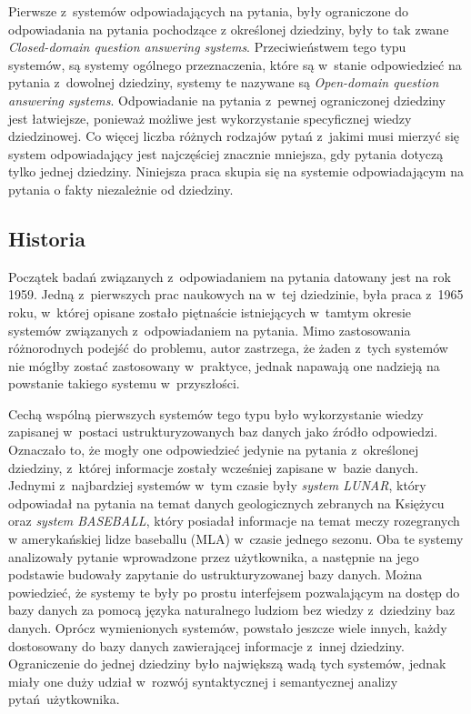 \documentclass[a4paper, twoside, openright, 12pt]{report}
\begin{document}
            Pierwsze z~systemów odpowiadających na pytania, były ograniczone do odpowiadania na pytania pochodzące z
            określonej dziedziny, były to tak zwane \emph{Closed-domain question answering systems}. Przeciwieństwem
            tego typu systemów, są systemy ogólnego przeznaczenia, które są w~stanie odpowiedzieć na pytania z~dowolnej
            dziedziny, systemy te nazywane są \emph{Open-domain question answering systems}. Odpowiadanie
            na pytania z~pewnej ograniczonej dziedziny jest łatwiejsze, ponieważ możliwe jest wykorzystanie specyficznej
            wiedzy dziedzinowej. Co więcej liczba różnych rodzajów pytań z~jakimi musi mierzyć się system odpowiadający
            jest najczęściej znacznie mniejsza, gdy pytania dotyczą tylko jednej dziedziny. Niniejsza praca skupia się
            na systemie odpowiadającym na pytania o fakty niezależnie od dziedziny.

        \subsection{Historia}
            Początek badań związanych z~odpowiadaniem na pytania datowany jest na rok 1959. Jedną z~pierwszych prac
            naukowych na w~tej dziedzinie, była praca z~1965 roku\cite{FIRSTWORKQA}, w~której opisane zostało piętnaście
            istniejących w~tamtym okresie systemów związanych z~odpowiadaniem na pytania. Mimo zastosowania różnorodnych
            podejść do problemu, autor zastrzega, że żaden z~tych systemów nie mógłby zostać zastosowany w~praktyce,
            jednak napawają one nadzieją na powstanie takiego systemu w~przyszłości.

            Cechą wspólną pierwszych systemów tego typu było wykorzystanie wiedzy zapisanej w~postaci ustrukturyzowanych
            baz danych jako źródło odpowiedzi. Oznaczało to, że mogły one odpowiedzieć jedynie na pytania z~określonej
            dziedziny, z~której informacje zostały wcześniej zapisane w~bazie danych. Jednymi z~najbardziej systemów
            w~tym czasie były \emph{system LUNAR}\cite{LUNAR}, który odpowiadał na pytania na temat danych geologicznych
            zebranych na Księżycu oraz \emph{system BASEBALL}\cite{BASEBALL}, który posiadał informacje na temat meczy rozegranych w
            amerykańskiej lidze baseballu (MLA) w~czasie jednego sezonu. Oba te systemy analizowały pytanie wprowadzone
            przez użytkownika, a następnie na jego podstawie budowały zapytanie do ustrukturyzowanej bazy danych. Można
            powiedzieć, że systemy te były po prostu interfejsem pozwalającym na dostęp do bazy danych za pomocą języka
            naturalnego ludziom bez wiedzy z~dziedziny baz danych. Oprócz wymienionych systemów, powstało jeszcze wiele
            innych, każdy dostosowany do bazy danych zawierającej informacje z~innej dziedziny. Ograniczenie do jednej
            dziedziny było największą wadą tych systemów, jednak miały one duży udział w~rozwój syntaktycznej i
            semantycznej analizy pytań użytkownika\cite{QASURVEY}.
\end{document}
